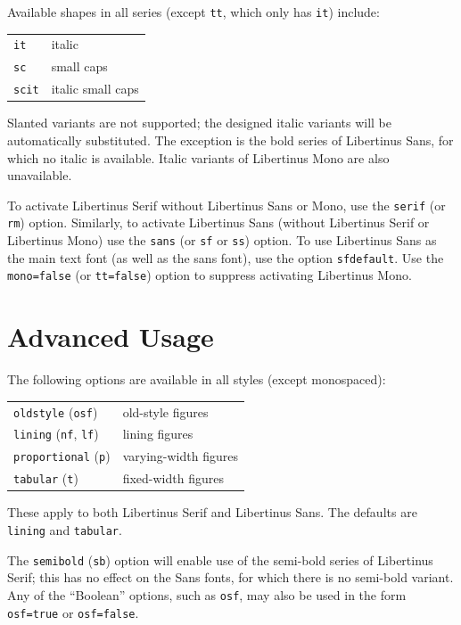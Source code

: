 \documentclass[11pt]{article}
\begin{document}
Available shapes in all series (except \texttt{tt}, which
only has \texttt{it}) include:
\begin{list}{}{}\item
\begin{tabular}{ll}
\texttt{it} &               italic\\
\texttt{sc} &            small caps\\
\texttt{scit} &            italic small caps
\end{tabular}
\end{list}
Slanted variants are not supported; the designed italic variants will be
automatically substituted. The exception is the bold series of Libertinus Sans,
for which no italic is available.   Italic variants of Libertinus Mono
are also unavailable.


To activate Libertinus Serif  without Libertinus Sans or Mono, use the \texttt{serif} (or \texttt{rm})
option. Similarly, to activate Libertinus Sans (without Libertinus Serif or Libertinus Mono) use the
\texttt{sans} (or \texttt{sf} or \texttt{ss}) option. To use Libertinus Sans as the main text font (as
well as the sans font), use the option \texttt{sfdefault}.
Use the \verb|mono=false| (or \verb|tt=false|) option to suppress
activating Libertinus Mono. 

\section{Advanced Usage}

The following options are available in all styles (except monospaced):
\begin{list}{}{}\item
\begin{tabular}{ll}
\texttt{oldstyle} (\texttt{osf}) &  old-style figures\\
\texttt{lining} (\texttt{nf}, \texttt{lf}) &  lining figures\\
\texttt{proportional} (\texttt{p})&  varying-width figures\\
\texttt{tabular} (\texttt{t}) &     fixed-width figures\\
\end{tabular}
\end{list}
These apply to both Libertinus Serif and Libertinus Sans.
The defaults are \texttt{lining} and \texttt{tabular}. 

The \texttt{semibold} (\texttt{sb}) option will enable use of the
semi-bold series of Libertinus Serif; this has no effect on the Sans fonts,
for which there is no semi-bold variant. 
Any of the ``Boolean'' options, such as \texttt{osf}, may 
also be used
in the form \verb|osf=true| or \verb|osf=false|.
\end{document}
